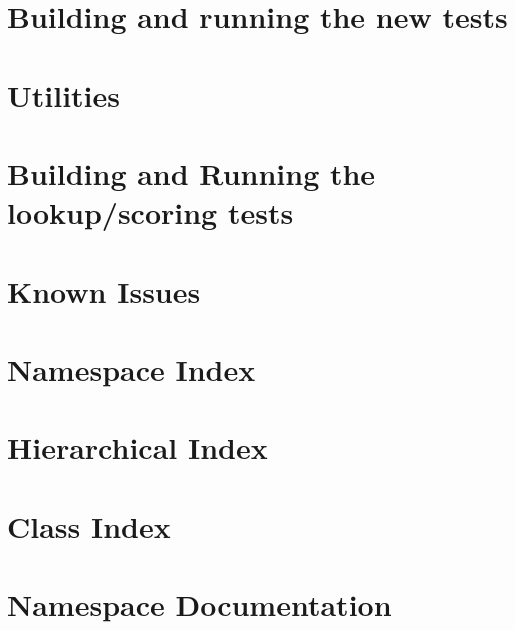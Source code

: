 \let\mypdfximage\pdfximage\def\pdfximage{\immediate\mypdfximage}\documentclass[twoside]{book}
\newcommand{\+}{\discretionary{\mbox{\scriptsize$\hookleftarrow$}}{}{}}
\begin{document}
\chapter{Building and running the new tests}
\label{md___users_flavio_tmp_documentation-update__h_elib__t_e_s_t_s}

\chapter{Utilities}
\label{md___users_flavio_tmp_documentation-update__h_elib_utils__r_e_a_d_m_e}

\chapter{Building and Running the lookup/scoring tests}
\label{md___users_flavio_tmp_documentation-update__h_elib_misc_psi__r_e_a_d_m_e}

\chapter{Known Issues}
\label{md___users_flavio_tmp_documentation-update__h_elib__i_s_s_u_e_s}

\chapter{Namespace Index}

\chapter{Hierarchical Index}

\chapter{Class Index}

\chapter{Namespace Documentation}








\end{document}
